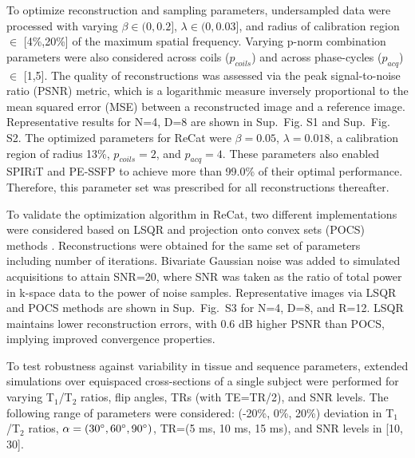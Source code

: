 \documentclass[11pt, onecolumn]{article}
\begin{document}
To optimize reconstruction and sampling parameters, undersampled data were processed with varying $\beta \in (0,0.2]$, $\lambda \in (0,0.03]$, and radius of calibration region $\in$ [4\%,20\%] of the maximum spatial frequency. Varying p-norm combination parameters were also considered across coils ($p_{coils}$) and across phase-cycles ($p_{acq}$) $\in$ [1,5]. The quality of reconstructions was assessed via the peak signal-to-noise ratio (PSNR) metric, which is a logarithmic measure inversely proportional to the mean squared error (MSE) between a reconstructed image and a reference image. Representative results for N=4, D=8 are shown in Sup.~Fig. S1 and Sup.~Fig. S2. The optimized parameters for ReCat were $\beta=0.05$, $\lambda=0.018$, a calibration region of radius 13\%, $p_{coils}=2$, and $p_{acq}=4$. These parameters also enabled SPIRiT and PE-SSFP to achieve more than 99.0\% of their optimal performance. Therefore, this parameter set was prescribed for all reconstructions thereafter.

To validate the optimization algorithm in ReCat, two different implementations were considered based on LSQR and projection onto convex sets (POCS) methods \cite{Lustig:2010hs}. Reconstructions were obtained for the same set of parameters including number of iterations. Bivariate Gaussian noise was added to simulated acquisitions to attain SNR=20, where SNR was taken as the ratio of total power in k-space data to the power of noise samples. Representative images via LSQR and POCS methods are shown in Sup.~Fig.~S3 for N=4, D=8, and R=12. LSQR maintains lower reconstruction errors, with 0.6 dB higher PSNR than POCS, implying improved convergence properties.

To test robustness against variability in tissue and sequence parameters, extended simulations over equispaced cross-sections of a single subject were performed for varying T$_1$/T$_2$ ratios, flip angles, TRs (with TE=TR/2), and SNR levels. The following range of parameters were considered: (-20\%, 0\%, 20\%) deviation in T$_1$/T$_2$ ratios, $\alpha=(30\degree, 60\degree, 90\degree)$, TR=(5 ms, 10 ms, 15 ms), and SNR levels in [10, 30].


\end{document}
